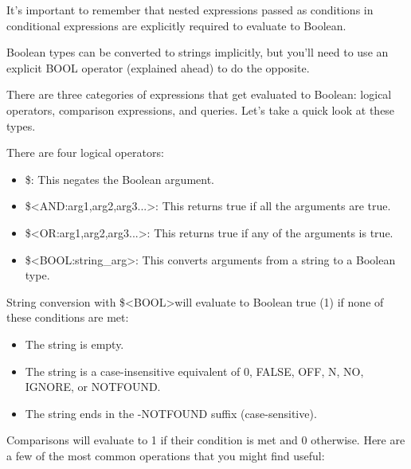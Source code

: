 It’s important to remember that nested expressions passed as conditions in conditional expressions are explicitly required to evaluate to Boolean.

Boolean types can be converted to strings implicitly, but you’ll need to use an explicit BOOL operator (explained ahead) to do the opposite.

There are three categories of expressions that get evaluated to Boolean: logical operators, comparison expressions, and queries. Let’s take a quick look at these types.


There are four logical operators:

\begin{itemize}
\item
\$<NOT:arg>: This negates the Boolean argument.

\item
\$<AND:arg1,arg2,arg3...>: This returns true if all the arguments are true.

\item
\$<OR:arg1,arg2,arg3...>: This returns true if any of the arguments is true.

\item
\$<BOOL:string\_arg>: This converts arguments from a string to a Boolean type.
\end{itemize}

String conversion with \$<BOOL>will evaluate to Boolean true (1) if none of these conditions are met:

\begin{itemize}
\item
The string is empty.

\item
The string is a case-insensitive equivalent of 0, FALSE, OFF, N, NO, IGNORE, or NOTFOUND.

\item
The string ends in the -NOTFOUND suffix (case-sensitive).
\end{itemize}


Comparisons will evaluate to 1 if their condition is met and 0 otherwise. Here are a few of the most common operations that you might find useful:

